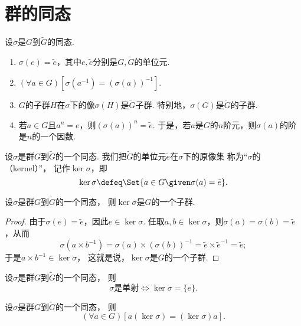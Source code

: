 \section{群的同态}
\begin{property}
设\(\sigma\)是\(G\)到\(\tilde{G}\)的同态.
\begin{enumerate}
	\item \(\sigma(e)=\tilde{e}\)，其中\(e,\tilde{e}\)分别是\(G,\tilde{G}\)的单位元.
	\item \((\forall a \in G)[\sigma(a^{-1})=(\sigma(a))^{-1}]\).
	\item \(G\)的子群\(H\)在\(\sigma\)下的像\(\sigma(H)\)是\(\tilde{G}\)子群.
	特别地，\(\sigma(G)\)是\(\tilde{G}\)的子群.
	\item 若\(a \in G\)且\(a^n = e\)，则\((\sigma(a))^n = \tilde{e}\).
	于是，若\(a\)是\(G\)的\(n\)阶元，则\(\sigma(a)\)的阶是\(n\)的一个因数.
\end{enumerate}
\end{property}

\begin{definition}
设\(\sigma\)是群\(G\)到\(\tilde{G}\)的一个同态.
我们把\(\tilde{G}\)的单位元\(\tilde{e}\)在\(\sigma\)下的原像集%
称为“\(\sigma\)的（kernel）”，
记作\(\ker\sigma\)，即\[
	\ker\sigma \defeq \Set{ a \in G \given \sigma(a) = \tilde{e} }.
\]
\end{definition}

\begin{theorem}
设\(\sigma\)是群\(G\)到\(\tilde{G}\)的一个同态，
则\(\ker\sigma\)是\(G\)的一个子群.
\begin{proof}
由于\(\sigma(e)=\tilde{e}\)，因此\(e\in\ker\sigma\).
任取\(a,b\in\ker\sigma\)，则\(\sigma(a)=\sigma(b)=\tilde{e}\)，从而\[
	\sigma(a \times b^{-1}) = \sigma(a) \times (\sigma(b))^{-1}
	= \tilde{e} \times \tilde{e}^{-1}
	= \tilde{e};
\]
于是\(a \times b^{-1} \in \ker\sigma\)，
这就是说，\(\ker\sigma\)是\(G\)的一个子群.
\end{proof}
\end{theorem}

\begin{theorem}
设\(\sigma\)是群\(G\)到\(\tilde{G}\)的一个同态，
则\[
	\text{\(\sigma\)是单射}
	\iff
	\ker\sigma=\{e\}.
\]
\end{theorem}

\begin{theorem}
设\(\sigma\)是群\(G\)到\(\tilde{G}\)的一个同态，
则\[
	(\forall a \in G)[a(\ker\sigma)=(\ker\sigma)a].
\]
\end{theorem}
